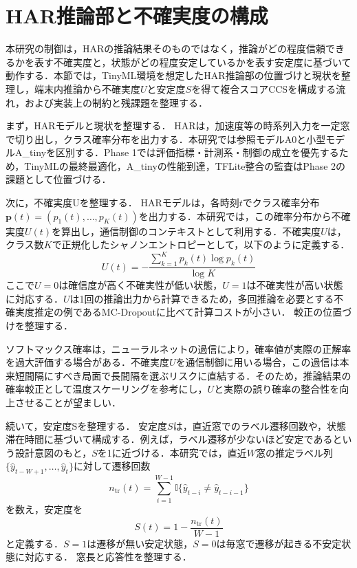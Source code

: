﻿%
\section{HAR推論部と不確実度の構成}
\label{sec:har_uncertainty}

本研究の制御は，HARの推論結果そのものではなく，推論がどの程度信頼できるかを表す不確実度と，状態がどの程度安定しているかを表す安定度に基づいて動作する．本節では，TinyML環境を想定したHAR推論部の位置づけと現状を整理し，端末内推論から不確実度$U$と安定度$S$を得て複合スコアCCSを構成する流れ，および実装上の制約と残課題を整理する．

まず，HARモデルと現状を整理する．
HARは，加速度等の時系列入力を一定窓で切り出し，クラス確率分布を出力する．本研究では参照モデルA0と小型モデルA\_tinyを区別する．Phase 1では評価指標・計測系・制御の成立を優先するため，TinyMLの最終最適化，A\_tinyの性能到達，TFLite整合の監査はPhase 2の課題として位置づける．

次に，不確実度Uを整理する．
HARモデルは，各時刻$t$でクラス確率分布$\mathbf{p}(t)=(p_1(t),\dots,p_K(t))$を出力する．本研究では，この確率分布から不確実度$U(t)$を算出し，通信制御のコンテキストとして利用する．不確実度$U$は，クラス数$K$で正規化したシャノンエントロピーとして，以下のように定義する．
\begin{equation}
  U(t) = -\frac{\sum_{k=1}^{K} p_k(t)\log p_k(t)}{\log K}
\end{equation}
ここで$U=0$は確信度が高く不確実性が低い状態，$U=1$は不確実性が高い状態に対応する．$U$は1回の推論出力から計算できるため，多回推論を必要とする不確実度推定の例であるMC-Dropoutに比べて計算コストが小さい．
較正の位置づけを整理する．

ソフトマックス確率は，ニューラルネットの過信により，確率値が実際の正解率を過大評価する場合がある．不確実度$U$を通信制御に用いる場合，この過信は本来短間隔にすべき局面で長間隔を選ぶリスクに直結する．そのため，推論結果の確率較正として温度スケーリングを参考にし，$U$と実際の誤り確率の整合性を向上させることが望ましい．

続いて，安定度Sを整理する．
安定度$S$は，直近窓でのラベル遷移回数や，状態滞在時間に基づいて構成する．例えば，ラベル遷移が少ないほど安定であるという設計意図のもと，$S$を1に近づける．本研究では，直近$W$窓の推定ラベル列$\{\hat{y}_{t-W+1},\dots,\hat{y}_t\}$に対して遷移回数
\begin{equation}
  n_{\mathrm{tr}}(t)=\sum_{i=1}^{W-1} \mathbb{I}\{\hat{y}_{t-i}\neq \hat{y}_{t-i-1}\}
\end{equation}
を数え，安定度を
\begin{equation}
  S(t)=1-\frac{n_{\mathrm{tr}}(t)}{W-1}
\end{equation}
と定義する．$S=1$は遷移が無い安定状態，$S=0$は毎窓で遷移が起きる不安定状態に対応する．
窓長と応答性を整理する．

